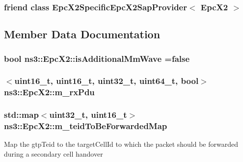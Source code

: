 \subsubsection[{\texorpdfstring{Epc\+X2\+Specific\+Epc\+X2\+Sap\+Provider$<$ Epc\+X2 $>$}{EpcX2SpecificEpcX2SapProvider< EpcX2 >}}]{\setlength{\rightskip}{0pt plus 5cm}friend class {\bf Epc\+X2\+Specific\+Epc\+X2\+Sap\+Provider}$<$ {\bf Epc\+X2} $>$\hspace{0.3cm}{\ttfamily [friend]}}\hypertarget{classns3_1_1EpcX2_a5fa3eadb39e71e0c9f7a469a8315c690}{}\label{classns3_1_1EpcX2_a5fa3eadb39e71e0c9f7a469a8315c690}


\subsection{Member Data Documentation}
\subsubsection[{\texorpdfstring{is\+Additional\+Mm\+Wave}{isAdditionalMmWave}}]{\setlength{\rightskip}{0pt plus 5cm}bool ns3\+::\+Epc\+X2\+::is\+Additional\+Mm\+Wave ={\bf false}}\hypertarget{classns3_1_1EpcX2_a3cc979cc2ca388967ddb4ca05f2d601d}{}\label{classns3_1_1EpcX2_a3cc979cc2ca388967ddb4ca05f2d601d}
\subsubsection[{\texorpdfstring{m\+\_\+rx\+Pdu}{m_rxPdu}}]{$<$uint16\+\_\+t, uint16\+\_\+t, uint32\+\_\+t, uint64\+\_\+t, bool$>$ ns3\+::\+Epc\+X2\+::m\+\_\+rx\+Pdu\hspace{0.3cm}{\ttfamily [private]}}\hypertarget{classns3_1_1EpcX2_a00f11080fe6a1d7020bfae006445eb59}{}\label{classns3_1_1EpcX2_a00f11080fe6a1d7020bfae006445eb59}
\subsubsection[{\texorpdfstring{m\+\_\+teid\+To\+Be\+Forwarded\+Map}{m_teidToBeForwardedMap}}]{\setlength{\rightskip}{0pt plus 5cm}std\+::map$<$uint32\+\_\+t, uint16\+\_\+t$>$ ns3\+::\+Epc\+X2\+::m\+\_\+teid\+To\+Be\+Forwarded\+Map\hspace{0.3cm}{\ttfamily [private]}}\hypertarget{classns3_1_1EpcX2_a18b54cbbfdd1a869ce3c504274294ab6}{}\label{classns3_1_1EpcX2_a18b54cbbfdd1a869ce3c504274294ab6}
Map the gtp\+Teid to the target\+Cell\+Id to which the packet should be forwarded during a secondary cell handover 
